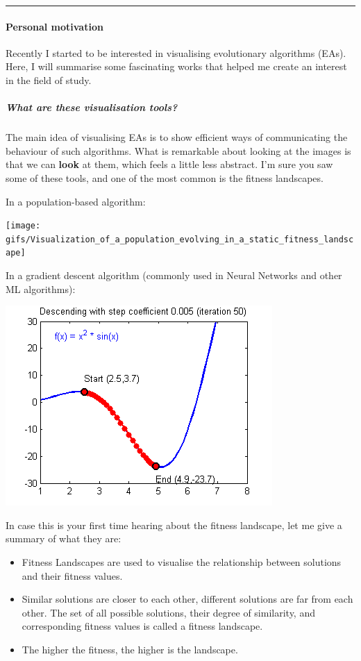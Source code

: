 \documentclass[
]{article}
\providecommand{\tightlist}{%
  \setlength{\itemsep}{0pt}\setlength{\parskip}{0pt}}
\begin{document}
\begin{center}\rule{0.5\linewidth}{0.5pt}\end{center}

\hypertarget{personal-motivation}{%
\paragraph{Personal motivation}\label{personal-motivation}}

Recently I started to be interested in visualising evolutionary
algorithms (EAs). Here, I will summarise some fascinating works that
helped me create an interest in the field of study.

\hypertarget{what-are-these-visualisation-tools}{%
\subparagraph{What are these visualisation
tools?}\label{what-are-these-visualisation-tools}}

The main idea of visualising EAs is to show efficient ways of
communicating the behaviour of such algorithms. What is remarkable about
looking at the images is that we can \textbf{look} at them, which feels
a little less abstract. I'm sure you saw some of these tools, and one of
the most common is the fitness landscapes.

In a population-based algorithm:

\begin{center}\texttt{[image: gifs/Visualization\_of\_a\_population\_evolving\_in\_a\_static\_fitness\_landscape]} \end{center}

In a gradient descent algorithm (commonly used in Neural Networks and
other ML algorithms):

\begin{center}\includegraphics[width=0.5\linewidth]{gifs/sgd} \end{center}

In case this is your first time hearing about the fitness landscape, let
me give a summary of what they are:

\begin{itemize}
\tightlist
\item
  Fitness Landscapes are used to visualise the relationship between
  solutions and their fitness values.
\item
  Similar solutions are closer to each other, different solutions are
  far from each other. The set of all possible solutions, their degree
  of similarity, and corresponding fitness values is called a fitness
  landscape.
\item
  The higher the fitness, the higher is the landscape.
\end{itemize}
\end{document}
